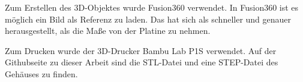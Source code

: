 Zum Erstellen des 3D-Objektes wurde Fusion360\cite{fusion360} verwendet.
In Fusion360 ist es möglich ein Bild als Referenz zu laden. 
Das hat sich als schneller und genauer herausgestellt, als die Maße von der 
Platine zu nehmen.







Zum Drucken wurde der 3D-Drucker Bambu Lab P1S \cite{bambulabP1S} verwendet.
Auf der Githubseite zu dieser Arbeit sind die STL-Datei und eine STEP-Datei
des Gehäuses zu finden\cite{meinGithub}.
